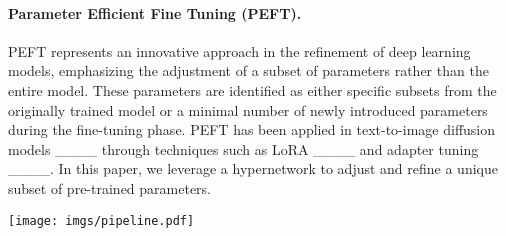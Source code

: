 



\paragraph{\textbf{Parameter Efficient Fine Tuning (PEFT).}} PEFT represents an innovative approach in the refinement of deep learning models, emphasizing the adjustment of a subset of parameters rather than the entire model. These parameters are identified as either specific subsets from the originally trained model or a minimal number of newly introduced parameters during the fine-tuning phase. PEFT has been applied in text-to-image diffusion models ____ through techniques such as LoRA ____ and adapter tuning ____. In this paper, we leverage a hypernetwork to adjust and refine a unique subset of pre-trained parameters.

\begin{figure*}[t]
    \centering
    \texttt{[image: imgs/pipeline.pdf]}
    \caption{The SigStyle framework. First, given a style image, we perform hypernetwork-powered style-aware fine-tuning for style inversion and represent the reference style as a special token * (see Figure \ref{fig:method}.a). In Figure \ref{fig:method}.b, the upper branch represents the reconstruction process of the content image, while the lower branch represents the generation process of the target image. When generating the target image using a pre-trained model and target text, we first use DDIM Inversion to map the content image into noise latents, which are then copied as the initial noise for generating the target image. Then, we adopt time-aware attention swapping to inject structural and content information during the first $k$ steps of the denoising process (see Figure b). In the subsequent $T-k$ steps, we proceed with the usual denoising process without any swapping. Finally, by decoding with VAE, we obtain the style-transferred image. }
    \label{fig:method}
\end{figure*}